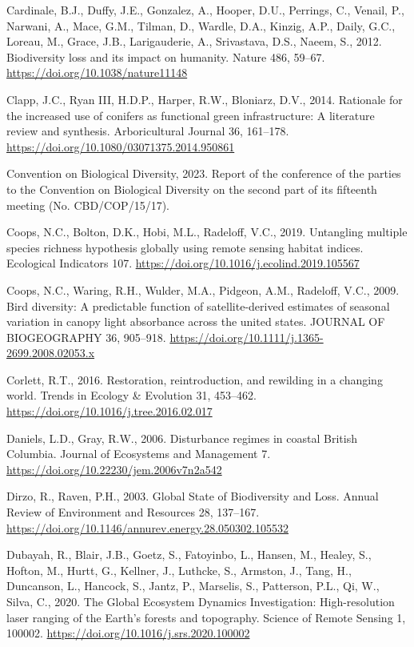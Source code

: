 \documentclass[
]{agujournal2019}
\newlength{\cslhangindent}
\newenvironment{CSLReferences}[2] %
 {\begin{list}{}{%
  \setlength{\itemindent}{0pt}
  \setlength{\leftmargin}{0pt}
  \setlength{\parsep}{0pt}
  \ifodd #1
   \setlength{\leftmargin}{\cslhangindent}
   \setlength{\itemindent}{-1\cslhangindent}
  \fi
  \setlength{\itemsep}{#2\baselineskip}}}
 {\end{list}}
\begin{document}
\begin{CSLReferences}{1}{0}
Cardinale, B.J., Duffy, J.E., Gonzalez, A., Hooper, D.U., Perrings, C.,
Venail, P., Narwani, A., Mace, G.M., Tilman, D., Wardle, D.A., Kinzig,
A.P., Daily, G.C., Loreau, M., Grace, J.B., Larigauderie, A.,
Srivastava, D.S., Naeem, S., 2012. Biodiversity loss and its impact on
humanity. Nature 486, 59--67. \url{https://doi.org/10.1038/nature11148}

Clapp, J.C., Ryan III, H.D.P., Harper, R.W., Bloniarz, D.V., 2014.
Rationale for the increased use of conifers as functional green
infrastructure: A literature review and synthesis. Arboricultural
Journal 36, 161--178. \url{https://doi.org/10.1080/03071375.2014.950861}

Convention on Biological Diversity, 2023. Report of the conference of
the parties to the {Convention} on {Biological Diversity} on the second
part of its fifteenth meeting (No. CBD/COP/15/17).

Coops, N.C., Bolton, D.K., Hobi, M.L., Radeloff, V.C., 2019. Untangling
multiple species richness hypothesis globally using remote sensing
habitat indices. Ecological Indicators 107.
\url{https://doi.org/10.1016/j.ecolind.2019.105567}

Coops, N.C., Waring, R.H., Wulder, M.A., Pidgeon, A.M., Radeloff, V.C.,
2009. Bird diversity: A predictable function of satellite-derived
estimates of seasonal variation in canopy light absorbance across the
united states. JOURNAL OF BIOGEOGRAPHY 36, 905--918.
\url{https://doi.org/10.1111/j.1365-2699.2008.02053.x}

Corlett, R.T., 2016. Restoration, reintroduction, and rewilding in a
changing world. Trends in Ecology \& Evolution 31, 453--462.
\url{https://doi.org/10.1016/j.tree.2016.02.017}

Daniels, L.D., Gray, R.W., 2006. Disturbance regimes in coastal British
Columbia. Journal of Ecosystems and Management 7.
\url{https://doi.org/10.22230/jem.2006v7n2a542}

Dirzo, R., Raven, P.H., 2003. Global State of Biodiversity and Loss.
Annual Review of Environment and Resources 28, 137--167.
\url{https://doi.org/10.1146/annurev.energy.28.050302.105532}

Dubayah, R., Blair, J.B., Goetz, S., Fatoyinbo, L., Hansen, M., Healey,
S., Hofton, M., Hurtt, G., Kellner, J., Luthcke, S., Armston, J., Tang,
H., Duncanson, L., Hancock, S., Jantz, P., Marselis, S., Patterson,
P.L., Qi, W., Silva, C., 2020. The Global Ecosystem Dynamics
Investigation: High-resolution laser ranging of the Earth{'}s forests
and topography. Science of Remote Sensing 1, 100002.
\url{https://doi.org/10.1016/j.srs.2020.100002}


\end{CSLReferences}
\end{document}
